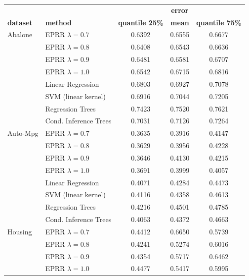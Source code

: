 \documentclass[review,preprint]{elsarticle}
\begin{document}
\begin{table}[t]
	\footnotesize
	\renewcommand{\arraystretch}{0.55}
	\begin{tabular}{ll|ccc}
		&&& \textbf{error} \\
		\textbf{dataset} & \textbf{method} & \textbf{quantile 25\%} & \textbf{mean} & \textbf{quantile 75\%} \\
		\hline
		Abalone	 & EPRR $\lambda = 0.7$ 	& 0.6392 & 0.6555 & 0.6677 \\
					 & EPRR $\lambda = 0.8$ 	& 0.6408 & 0.6543 & 0.6636 \\
					 & EPRR $\lambda = 0.9$ 	& 0.6481 & 0.6581 & 0.6707 \\
					 & EPRR $\lambda = 1.0$ 	& 0.6542 & 0.6715 & 0.6816 \\
					 & Linear Regression 	& 0.6803 & 0.6927 & 0.7078 \\
					 & SVM (linear kernel) 	& 0.6916 & 0.7044 & 0.7205 \\
					 & Regression Trees 	& 0.7423 & 0.7520 & 0.7621 \\
					 & Cond. Inference Trees 	& 0.7031 & 0.7126 & 0.7264 \\
		\hline
		Auto-Mpg	 & EPRR $\lambda = 0.7$ 	& 0.3635 & 0.3916 & 0.4147 \\
					 & EPRR $\lambda = 0.8$ 	& 0.3629 & 0.3956 & 0.4228 \\
					 & EPRR $\lambda = 0.9$ 	& 0.3646 & 0.4130 & 0.4215 \\
					 & EPRR $\lambda = 1.0$ 	& 0.3691 & 0.3999 & 0.4057 \\
					 & Linear Regression 	& 0.4071 & 0.4284 & 0.4473 \\
					 & SVM (linear kernel) 	& 0.4116 & 0.4358 & 0.4613 \\
					 & Regression Trees 	& 0.4216 & 0.4501 & 0.4785 \\
					 & Cond. Inference Trees 	& 0.4063 & 0.4372 & 0.4663 \\
		\hline
		Housing	 & EPRR $\lambda = 0.7$ 	& 0.4412 & 0.6650 & 0.5739 \\
					 & EPRR $\lambda = 0.8$ 	& 0.4241 & 0.5274 & 0.6016 \\
					 & EPRR $\lambda = 0.9$ 	& 0.4354 & 0.5717 & 0.6462 \\
					 & EPRR $\lambda = 1.0$ 	& 0.4477 & 0.5417 & 0.5995 \\

\end{tabular}
\end{table}
\end{document}
